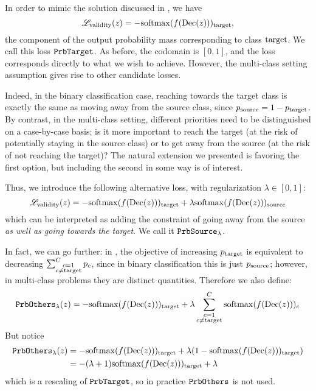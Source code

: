 \documentclass[../main.tex]{subfiles}
\begin{document}
In order to mimic the solution discussed in \cite{cohenGifsplanation2022}, we have
\begin{equation}
    \mathscr{L}_\text{validity}(z) = -\mathrm{softmax}(f(\operatorname{Dec}(z)))_{\mathrm{target}},
\end{equation}
\ie{} the component of the output probability mass corresponding to class $\mathrm{target}$.
We call this loss $\mathtt{PrbTarget}$.
As before, the codomain is $[0, 1]$, and the loss corresponds directly to what we wish to achieve.
However, the multi-class setting assumption gives rise to other candidate losses.

Indeed, in the binary classification case, reaching towards the target class is exactly the same as moving away from the source class, since $p_{\mathrm{source}} = 1 - p_{\mathrm{target}}$.
By contrast, in the multi-class setting, different priorities need to be distinguished on a case-by-case basis: is it more important to reach the target (at the risk of potentially staying in the source class) or to get away from the source (at the risk of not reaching the target)?
The natural extension we presented is favoring the first option, but including the second in some way is of interest.

Thus, we introduce the following alternative loss, with regularization $\lambda \in [0, 1]$:
\begin{equation}
    \mathscr{L}_\text{validity}(z) = -\mathrm{softmax}(f(\operatorname{Dec}(z)))_{\mathrm{target}}
+ \lambda \mathrm{softmax}(f(\operatorname{Dec}(z)))_{\mathrm{source}}
\end{equation}
which can be interpreted as adding the constraint of going away from the source \emph{as well as going towards the target}.
We call it $\mathtt{PrbSource}_{\lambda}$.

In fact, we can go further:
in \ls{}, the objective of increasing $p_{\mathrm{target}}$ is equivalent to decreasing $\sum_{\substack{{c}=1 \\ {c} \neq \mathrm{target}}}^C p_c$, since in binary classification this is just $p_{\mathrm{source}}$; however, in multi-class problems they are distinct quantities.
Therefore we also define:
\begin{align*}
    \mathtt{PrbOthers}_{\lambda}(z) = - \mathrm{softmax}(f(\operatorname{Dec}(z)))_{\mathrm{target}} + \lambda \sum_{\substack{{c}=1 \\ {c} \neq \mathrm{target}}}^C \mathrm{softmax}(f(\operatorname{Dec}(z)))_c
\end{align*}
But notice
\begin{align*}
    \mathtt{PrbOthers}_{\lambda}(z)
     & = - \mathrm{softmax}(f(\operatorname{Dec}(z)))_{\mathrm{target}} + \lambda (1 - \mathrm{softmax}(f(\operatorname{Dec}(z)))_{\mathrm{target}}) \\
     & = -(\lambda + 1) \mathrm{softmax}(f(\operatorname{Dec}(z)))_{\mathrm{target}} + \lambda
\end{align*}
which is a rescaling of $\mathtt{PrbTarget}$, so in practice $\mathtt{PrbOthers}_{}$ is not used.
\end{document}
